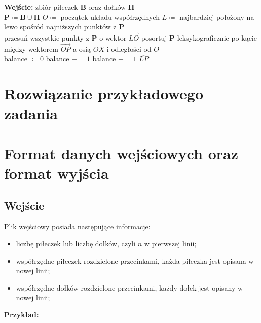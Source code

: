 \documentclass[10pt,a4paper]{article}
\begin{document}
	\begin{algorithmic}
		\State \textbf{Wejście:} zbiór piłeczek $\mathbf{B}$ oraz dołków $\mathbf{H}$  \\
		
			\State $\mathbf{P} \coloneqq \mathbf{B} \cup \mathbf{H}$ 
			\State $O \coloneqq$ początek układu współrzędnych
			\State $L \coloneqq$ najbardziej położony na lewo spośród najniższych punktów z $\mathbf{P}$ 
			\\
			\State przesuń wszystkie punkty z $\mathbf{P}$ o wektor $\overrightarrow{LO}$ 
			\State posortuj $\mathbf{P}$ leksykograficznie po kącie między wektorem $\overrightarrow{OP}$ a osią $OX$ i odległości od $O$  
			\\
			\State balance $\coloneqq 0$
			  
					\State balance $\mathrel{{+}{=}} 1$
				\Else
					\State balance $\mathrel{{-}{=}} 1$
				\EndIf
					\State \Return $\overline{LP}$
				\EndIf
			\EndFor
		\EndFunction
	\end{algorithmic}
	
	\section{Rozwiązanie przykładowego zadania}
	
	\section{Format danych wejściowych oraz format wyjścia}
	
	\subsection{Wejście}
	
	Plik wejściowy posiada następujące informacje:
	\begin{itemize}
		\item liczbę piłeczek lub liczbę dołków, czyli $n$ w pierwszej linii;
		\item współrzędne piłeczek rozdzielone przecinkami, każda piłeczka jest opisana w nowej linii;
		\item współrzędne dołków rozdzielone przecinkami, każdy dołek jest opisany w nowej linii;
	\end{itemize}

	\textbf{Przykład:} 
	
\end{document}

